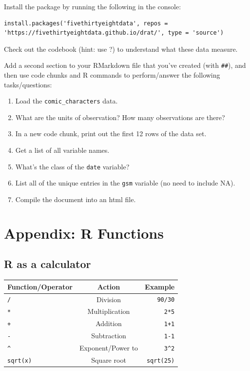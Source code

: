 \documentclass[
  letterpaper,
  DIV=11,
  numbers=noendperiod]{scrreprt}
\providecommand{\tightlist}{%
  \setlength{\itemsep}{0pt}\setlength{\parskip}{0pt}}\usepackage{longtable,booktabs,array}
\begin{document}
Install the package by running the following in the console:

\begin{verbatim}
install.packages('fivethirtyeightdata', repos = 'https://fivethirtyeightdata.github.io/drat/', type = 'source')
\end{verbatim}

Check out the codebook (hint: use ?) to understand what these data
measure.

Add a second section to your RMarkdown file that you've created (with
\texttt{\#\#}), and then use code chunks and R commands to
perform/answer the following tasks/questions:

\begin{enumerate}
\def\labelenumi{\alph{enumi}.}
\tightlist
\item
  Load the \texttt{comic\_characters} data.\\
\item
  What are the units of observation? How many observations are there?\\
\item
  In a new code chunk, print out the first 12 rows of the data set.
\item
  Get a list of all variable names.\\
\item
  What's the class of the \texttt{date} variable?\\
\item
  List all of the unique entries in the \texttt{gsm} variable (no need
  to include NA).
\item
  Compile the document into an html file.
\end{enumerate}

\section{Appendix: R Functions}\label{appendix-r-functions}

\subsection{R as a calculator}\label{r-as-a-calculator}

\begin{longtable}[]{@{}lcr@{}}
\toprule\noalign{}
Function/Operator & Action & Example \\
\midrule\noalign{}
\endhead
\bottomrule\noalign{}
\endlastfoot
\texttt{/} & Division & \texttt{90/30} \\
\texttt{*} & Multiplication & \texttt{2*5} \\
\texttt{+} & Addition & \texttt{1+1} \\
\texttt{-} & Subtraction & \texttt{1-1} \\
\texttt{\^{}} & Exponent/Power to & \texttt{3\^{}2} \\
\texttt{sqrt(x)} & Square root & \texttt{sqrt(25)} \\
\end{longtable}
\end{document}

